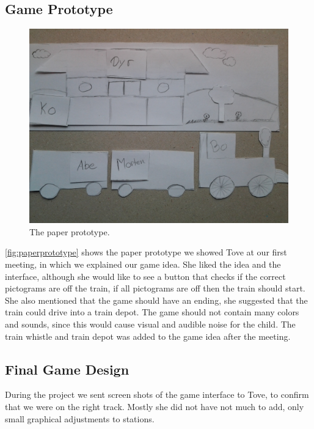 \subsection{Game Prototype}
\begin{figure}[H]
\centering
\includegraphics[width=0.9\linewidth]{img/screenshots/prototype1.jpg}
\caption{The paper prototype.}
\label{fig:paperprototype}
\end{figure}
\autoref{fig:paperprototype} shows the paper prototype we showed Tove at our first meeting, in which we explained our game idea. She liked the idea and the interface, although she would like to see a button that checks if the correct pictograms are off the train, if all pictograms are off then the train should start. She also mentioned that the game should have an ending, she suggested that the train could drive into a train depot. The game should not contain many colors and sounds, since this would cause visual and audible noise for the child. The train whistle and train depot was added to the game idea after the meeting.

\subsection{Final Game Design}\label{sec:designgameinterface}

During the project we sent screen shots of the game interface to Tove, to confirm that we were on the right track. Mostly she did not have not much to add, only small graphical adjustments to stations.

